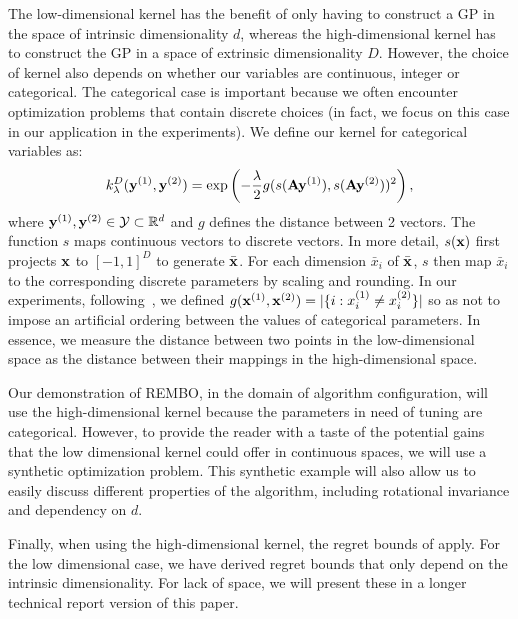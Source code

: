 \documentclass{article}
\begin{document}
The low-dimensional kernel has the benefit of only having to construct a GP in the space of intrinsic dimensionality $d$, whereas the high-dimensional kernel has to construct the GP in a space of extrinsic dimensionality $D$. However,
the choice of kernel also depends on whether our variables are continuous, integer or categorical. The categorical case is important because we often encounter optimization problems that contain discrete choices (in fact, we focus on this case in our application in the experiments). We define our kernel for categorical variables as:
$$k^D_{\lambda}(\mathbf{y}^{(1)}, \mathbf{y}^{(2)}) = \exp\left(-\frac{\lambda}{2} g(s(\mathbf{A}\mathbf{y}^{(1)}), s(\mathbf{A}\mathbf{y}^{(2)}))^2\right),$$
where $\mathbf{y}^{(1)}, \mathbf{y}^{(2)} \in {\cal Y} \subset \mathbb{R}^d$ and $g$ defines the distance between 2 vectors. The function $s$ maps continuous vectors to discrete vectors. In more detail, $s(\mathbf{x})$ first projects $\mathbf{x}$ to $[-1,1]^D$ to generate $\bar{\mathbf{x}}$. For each dimension $\bar{x}_i$ of $\bar{\mathbf{x}}$, $s$ then map $\bar{x}_i$ to the corresponding discrete parameters by scaling and rounding. In our experiments, following~\cite{Hutter:2009}, we defined $g(\mathbf{x}^{(1)}, \mathbf{x}^{(2)}) = |\{i: x^{(1)}_i \neq x^{(2)}_i\}|$ 
so as not to impose an artificial ordering between the values of categorical parameters. 
In essence, we measure the distance between two points in the low-dimensional space as the distance between their mappings in the high-dimensional space. 

Our demonstration of REMBO, in the domain of algorithm configuration, will use the high-dimensional kernel because the parameters in need of tuning are categorical. However, to provide the reader with a taste of the potential gains that the low dimensional kernel could offer in continuous spaces, we will use a synthetic optimization problem. This synthetic example will also allow us to easily discuss different properties of the algorithm, including rotational invariance and dependency on $d$.

Finally, when using the high-dimensional kernel, the regret bounds of \cite{Srinivas:2010,Bull:2011,deFreitas:2012} apply. For the low dimensional case, we have derived regret bounds that only depend on the intrinsic dimensionality. For lack of space, we will present these in a longer technical report version of this paper.
\end{document}
